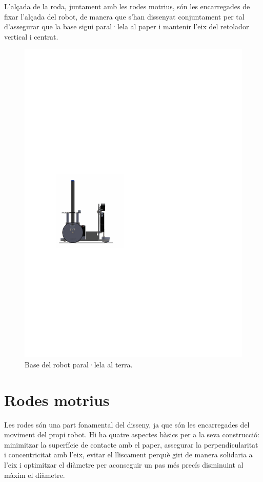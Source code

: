 L’alçada de la roda, juntament amb les rodes motrius, són les encarregades de fixar l’alçada del robot, de manera que s’han dissenyat conjuntament per tal d’assegurar que la base sigui paral·lela al paper i mantenir l’eix del retolador vertical i centrat.

 \begin{figure}[H]
 	\centering
 	\includegraphics{pla}
 	\caption{Base del robot paral·lela al terra.}
 	\label{fig:pla}
 \end{figure}



\section{Rodes motrius}

Les rodes són una part fonamental del disseny, ja que són les encarregades del moviment del propi robot. Hi ha quatre aspectes bàsics per a la seva construcció: minimitzar la superfície de contacte amb el paper, assegurar la perpendicularitat i concentricitat amb l’eix, evitar el lliscament perquè giri de manera solidaria a l'eix i optimitzar el diàmetre per aconseguir un pas més precís disminuint al màxim el diàmetre. 

